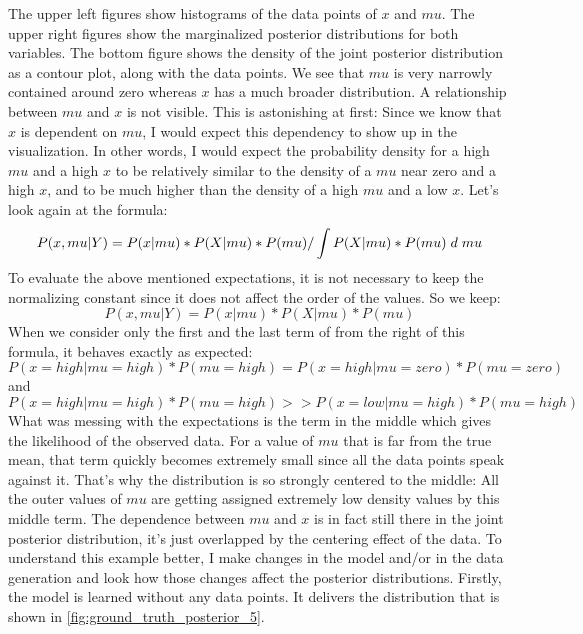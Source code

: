 \documentclass{article}
\begin{document}
The upper left figures show histograms of the data points of $x$ and $mu$. The upper right figures show the marginalized posterior distributions for both variables. The bottom figure shows the density of the joint posterior distribution as a contour plot, along with the data points. We see that $mu$ is very narrowly contained around zero whereas $x$ has a much broader distribution. A relationship between $mu$ and $x$ is not visible. This is astonishing at first: Since we know that $x$ is dependent on $mu$, I would expect this dependency to show up in the visualization. In other words, I would expect the probability density for a high $mu$ and a high $x$ to be relatively similar to the density of a $mu$ near zero and a high $x$, and to be much higher than the density of a high $mu$ and a low $x$.
Let's look again at the formula:
\begin{equation}
P(x,mu|Y) = P(x|mu) * P(X|mu) * P(mu) / \int P(X|mu) * P(mu) \hspace{1mm} d \hspace{1mm} mu
\end{equation}
To evaluate the above mentioned expectations, it is not necessary to keep the normalizing constant since it does not affect the order of the values. So we keep:
\begin{equation}
P(x,mu|Y) = P(x|mu) * P(X|mu) * P(mu)
\end{equation}
When we consider only the first and the last term of from the right of this formula, it behaves exactly as expected: \begin{equation}
P(x=high|mu=high)*P(mu=high) = P(x=high|mu=zero)*P(mu=zero)
\end{equation}
and 
\begin{equation}
P(x=high|mu=high)*P(mu=high) >> P(x=low|mu=high)*P(mu=high)
\end{equation} What was messing with the expectations is the term in the middle which gives the likelihood of the observed data. For a value of $mu$ that is far from the true mean, that term quickly becomes extremely small since all the data points speak against it. That's why the distribution is so strongly centered to the middle: All the outer values of $mu$ are getting assigned extremely low density values by this middle term. 
The dependence between $mu$ and $x$ is in fact still there in the joint posterior distribution, it's just overlapped by the centering effect of the data. To understand this example better, I make changes in the model and/or in the data generation and look how those changes affect the posterior distributions. Firstly, the model is learned without any data points. It delivers the distribution that is shown in \autoref{fig:ground_truth_posterior_5}.
\end{document}
